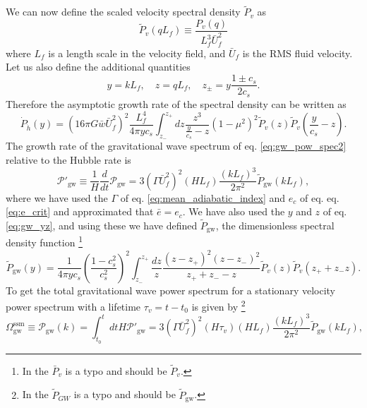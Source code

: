 We can now define the scaled velocity spectral density $\tilde{P}_v$ as
\begin{equation}
\tilde{P}_v (qL_f) \equiv \frac{P_v(q)}{L_f^3 \bar{U}_f^2}
\label{eq:tilde_p_v}
\end{equation}
where $L_f$ is a length scale in the velocity field, and $\bar{U}_f$ is the RMS fluid velocity.
Let us also define the additional quantities
\begin{equation}
y = kL_f, \quad z = qL_f, \quad z_\pm = y \frac{1 \pm c_s}{2 c_s}.
\label{eq:gw_yz}
\end{equation}
Therefore the asymptotic growth rate of the spectral density can be written as
\begin{equation}
\dot{P}_{\dot{h}}(y) =
\left( 16 \pi G \bar{w} \bar{U}_f^2 \right)^2
\frac{L_f^4}{4 \pi y c_s}
\int_{z_-}^{z_+} dz
\frac{z^3}{\frac{y}{c_s} - z}
(1 - \mu^2)^2
\tilde{P}_v (z) \tilde{P}_v \left( \frac{y}{c_s} - z \right).
\end{equation}
The growth rate of the gravitational wave spectrum of eq. \eqref{eq:gw_pow_spec2} relative to the Hubble rate is
\cite[eq. 3.46]{hindmarsh_gw_pt_2019}
\begin{equation}
\mathcal{P}'_{\text{gw}} \equiv \frac{1}{H} \frac{d}{dt} \mathcal{P}_{\text{gw}}
= 3 \left( \Gamma \bar{U}_f^2 \right)^2 (HL_f) \frac{(kL_f)^3}{2 \pi^2} \tilde{P}_{\text{gw}} (kL_f),
\label{eq:pow_gw_prime}
\end{equation}
where we have used the $\Gamma$ of eq. \eqref{eq:mean_adiabatic_index} and $e_c$ of eq. eq. \eqref{eq:e_crit} and approximated that $\bar{e} = e_c$.
We have also used the $y$ and $z$ of eq. \eqref{eq:gw_yz}, and using these we have defined $\tilde{P}_{\text{gw}}$,
the dimensionless spectral density function
\cite[eq. 3.47]{hindmarsh_gw_pt_2019}%
\footnote{In \cite{hindmarsh_gw_pt_2019} the $\bar{P}_v$ is a typo and should be $\tilde{P}_v$.}
\begin{equation}
\tilde{P}_\text{gw} (y) = \frac{1}{4\pi yc_s} \left(\frac{1-c_s^2}{c_s^2}\right)^2
\int_{z_-}^{z_+} \frac{dz}{z}
\frac{(z-z_+)^2(z-z_-)^2}{z_+ + z_- - z}
\tilde{P}_v (z) \tilde{P}_v (z_+ + z_- z).
\label{eq:spectral_density}
\end{equation}
To get the total gravitational wave power spectrum for a stationary velocity power spectrum with a lifetime $\tau_v = t - t_0$ is given by
\cite[eq. 3.48]{hindmarsh_gw_pt_2019}%
\footnote{In \cite{hindmarsh_gw_pt_2019} the $\tilde{P}_{GW}$ is a typo and should be $\tilde{P}_\text{gw}$.}
\begin{equation}
\Omega_\text{gw}^\text{ssm}
\equiv \mathcal{P}_\text{gw}(k)
= \int_{t_0}^{t} dt H \mathcal{P}'_\text{gw}
= 3 \left( \Gamma \bar{U}_f^2 \right)^2 (H \tau_v)(H L_f) \frac{(kL_f)^3}{2\pi^2} \tilde{P}_\text{gw} (kL_f),
\label{eq:gw_pow_spec3}
\end{equation}
